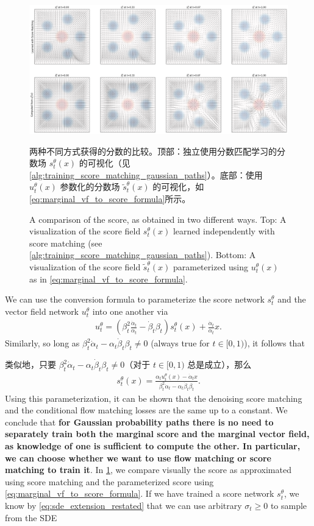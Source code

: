 \begin{figure}[!h]
    \centering
    \includegraphics[width=\linewidth]{figures/score_field_comparison.png}
    \caption{\label{fig:score_fields}A comparison of the score, as obtained in two different ways. Top: A visualization of the score field $s_t^\theta(x)$ learned independently with score matching (see \cref{alg:training_score_matching_gaussian_paths}). Bottom: A visualization of the score field $\tilde{s}_t^\theta(x)$ parameterized using $u_t^\theta(x)$ as in \cref{eq:marginal_vf_to_score_formula}.}
    
    两种不同方式获得的分数的比较。顶部：独立使用分数匹配学习的分数场 $s_t^\theta(x)$ 的可视化（见\cref{alg:training_score_matching_gaussian_paths}）。底部：使用 $u_t^\theta(x)$ 参数化的分数场 $\tilde{s}_t^\theta(x)$ 的可视化，如\cref{eq:marginal_vf_to_score_formula}所示。
\end{figure}
We can use the conversion formula to parameterize the score network $s_t^\theta$ and the vector field network $u_t^\theta$ into one another via 
\begin{align}
u_t^\theta=\left(\beta_t^2\frac{\dot{\alpha}_t}{\alpha_t}-\dot{\beta}_t\beta_t\right)s_t^\theta(x)+\frac{\dot{\alpha}_t}{\alpha_t}x.
\label{eq:marginal_score_to_vf_formula}
\end{align}
Similarly, so long as $\beta_t^2\dot{\alpha}_t -\alpha_t\dot{\beta}_t\beta_t \neq 0$ (always true for $t \in [0,1)$), it follows that

类似地，只要 $\beta_t^2\dot{\alpha}_t -\alpha_t\dot{\beta}_t\beta_t \neq 0$（对于 $t \in [0,1)$ 总是成立），那么
\begin{align}
s_t^\theta(x) = \frac{\alpha_t u_t^\theta(x) - \dot{\alpha}_tx}{\beta_t^2\dot{\alpha}_t -\alpha_t\dot{\beta}_t\beta_t}.
\label{eq:marginal_vf_to_score_formula}
\end{align}
Using this parameterization, it can be shown that the denoising score matching and the conditional flow matching losses are the same up to a constant. We conclude that \textbf{for Gaussian probability paths there is no need to separately train both the marginal score and the marginal vector field, as knowledge of one is sufficient to compute the other. In particular, we can choose whether we want to use flow matching or score matching to train it}. In \cref{fig:score_fields}, we compare visually the score as approximated using score matching and the parameterized score using \cref{eq:marginal_vf_to_score_formula}. If we have trained a score network $s_t^\theta$, we know by \cref{eq:sde_extension_restated} that we can use arbitrary $\sigma_t\geq 0$ to sample from the SDE

